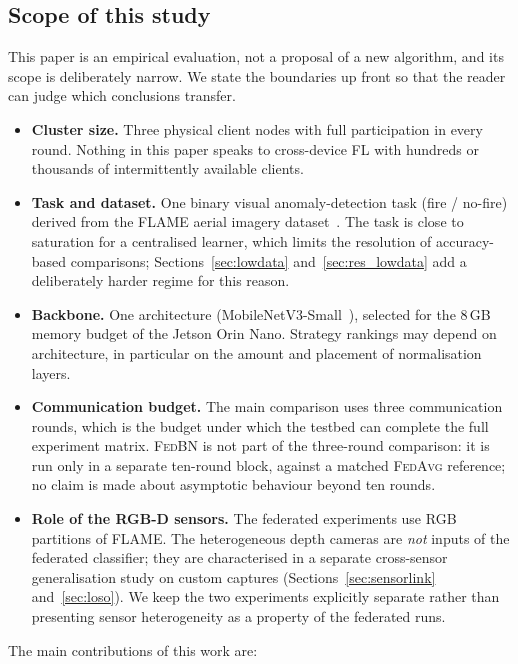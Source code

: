 \documentclass[journal]{IEEEtran}
\newcommand{\fedavg}{\textsc{FedAvg}}
\newcommand{\fedbn}{\textsc{FedBN}}
\begin{document}
\subsection{Scope of this study}
\label{sec:scope}

This paper is an empirical evaluation, not a proposal of a new algorithm, and its scope is deliberately narrow. We state the boundaries up front so that the reader can judge which conclusions transfer.

\begin{itemize}
    \item \textbf{Cluster size.} Three physical client nodes with full participation in every round. Nothing in this paper speaks to cross-device FL with hundreds or thousands of intermittently available clients.
    \item \textbf{Task and dataset.} One binary visual anomaly-detection task (fire / no-fire) derived from the FLAME aerial imagery dataset~\cite{shamsoshoara2021flame}. The task is close to saturation for a centralised learner, which limits the resolution of accuracy-based comparisons; Sections~\ref{sec:lowdata} and~\ref{sec:res_lowdata} add a deliberately harder regime for this reason.
    \item \textbf{Backbone.} One architecture (MobileNetV3-Small~\cite{howard2019mobilenetv3}), selected for the 8\,GB memory budget of the Jetson Orin Nano. Strategy rankings may depend on architecture, in particular on the amount and placement of normalisation layers.
    \item \textbf{Communication budget.} The main comparison uses three communication rounds, which is the budget under which the testbed can complete the full experiment matrix. \fedbn{} is not part of the three-round comparison: it is run only in a separate ten-round block, against a matched \fedavg{} reference; no claim is made about asymptotic behaviour beyond ten rounds.
    \item \textbf{Role of the RGB-D sensors.} The federated experiments use RGB partitions of FLAME. The heterogeneous depth cameras are \emph{not} inputs of the federated classifier; they are characterised in a separate cross-sensor generalisation study on custom captures (Sections~\ref{sec:sensorlink} and~\ref{sec:loso}). We keep the two experiments explicitly separate rather than presenting sensor heterogeneity as a property of the federated runs.
\end{itemize}

The main contributions of this work are:
\end{document}
